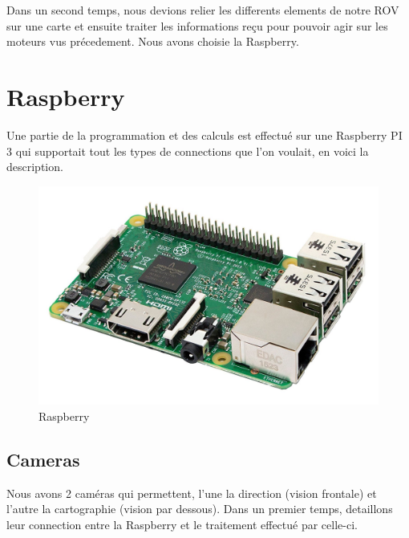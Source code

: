 \documentclass[a4paper,11pt]{report}
\begin{document}
	Dans un second temps, nous devions relier les differents elements de notre ROV sur une carte et ensuite traiter les informations reçu pour pouvoir agir sur les moteurs vus précedement. Nous avons choisie la Raspberry.
	
	\section{Raspberry}
		Une partie de la programmation et des calculs est effectué sur une Raspberry PI 3 qui supportait tout les types de connections que l'on voulait, en voici la description.
			\begin{figure}[!h]
					\begin{center}
						\includegraphics[scale=0.2]{Photos/Raspberry.jpg}
						\caption{Raspberry}
					\end{center}
				\end{figure}
				
		\subsection{Cameras}
			Nous avons 2 caméras qui permettent, l'une la direction (vision frontale) et l'autre la cartographie (vision par dessous). Dans un premier temps, detaillons leur connection entre la Raspberry et le traitement effectué par celle-ci.
			
\end{document}

